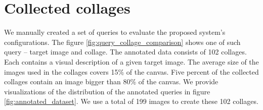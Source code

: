 \section{Collected collages}

We manually created a set of queries to evaluate the proposed system's configurations. The figure \ref{fig:query_collage_comparison} shows one of such query -- target image and collage. The annotated data consists of 102 collages. Each contains a visual description of a given target image. The average size of the images used in the collages covers 15\% of the canvas. Five percent of the collected collages contain an image bigger than 80\% of the canvas. We provide visualizations of the distribution of the annotated queries in figure \ref{fig:annotated_dataset}. We use a total of 199 images to create these 102 collages.

